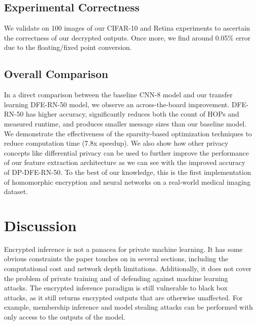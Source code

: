 \documentclass[conference]{IEEEtran}
\begin{document}
\subsection{Experimental Correctness}
We validate on 100 images of our CIFAR-10 and Retina experiments to ascertain the correctness of our decrypted outputs.  Once more, we find around 0.05\% error due to the floating/fixed point conversion.

\subsection{Overall Comparison}
In a direct comparison between the baseline CNN-8 model and our transfer learning DFE-RN-50 model, we observe an across-the-board improvement.  DFE-RN-50 has higher accuracy, significantly reduces both the count of HOPs and measured runtime, and produces smaller message sizes than our baseline model.  We demonstrate the effectiveness of the sparsity-based optimization techniques to reduce computation time (7.8x speedup). We also show how other privacy concepts like differential privacy can be used to further improve the performance of our feature extraction architecture as we can see with the improved accuracy of DP-DFE-RN-50. To the best of our knowledge, this is the first implementation of homomorphic encryption and neural networks on a real-world medical imaging dataset.  

\section{Discussion}
Encrypted inference is not a panacea for private machine learning.  It has some obvious constraints the paper touches on in several sections, including the computational cost and network depth limitations.  Additionally, it does not cover the problem of private training and of defending against machine learning attacks.  The encrypted inference paradigm is still vulnerable to black box attacks, as it still returns encrypted outputs that are otherwise unaffected. For example, membership inference \cite{Fredrikson:2015:MIA:2810103.2813677} and model stealing \cite{tramer2016stealingapis} attacks can be performed with only access to the outputs of the model.  

\end{document}
